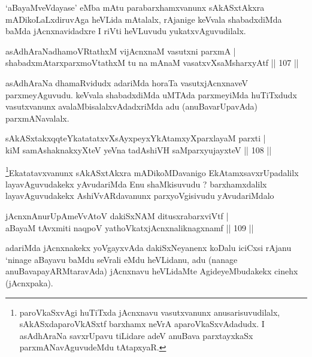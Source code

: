 \begin{artha}
`aBayaMveVdayase' eMba mAtu parabarxhamxvanunx sAkASxtAkxra mADikoLaLxdiruvAga heVLida mAtalalx, rAjanige keVvala shabadxdiMda baMda jAcnxnavidadxre I riVti heVLuvudu yukatxvAguvudilalx.
\end{artha}

\begin{shl}
asAdhAraNadhamoVRtathxM vijAcnxnaM vasutxni parxmA |\\
shabadxmAtarxparxmoVtathxM tu na mAnaM vasatxvXsaMsharxyAtf \hfill || 107 || 
\end{shl}

\begin{artha}
asAdhAraNa dhamaRvidudx adariMda horaTa vasutxjAcnxnaveV parxmeyAguvudu. keVvala shabadxdiMda uMTAda parxmeyiMda huTiTxdudx vasutxvanunx avalaMbisalalxvAdadxriMda adu (anuBavarUpavAda) parxmANavalalx.
\end{artha}

\begin{shl}
sAkASxtakxqqteYkatatatxvXsAyxpeyxYkAtamxyXparxlayaM parxti |\\
kiM samAshaknakxyXteV yeVna tadAshiVH saMparxyujayxteV \hfill || 108 || 
\end{shl}

\begin{artha}
\footnote{paroVkaSxvAgi huTiTxda jAcnxnavu vasutxvanunx anusarisuvudilalx, sAkASxdaparoVkASxtf barxhamx neVrA aparoVkaSxvAdadudx. I asAdhAraNa savxrUpavu tiLidare adeV anuBava parxtayxkaSx parxmANavAguvudeMdu tAtapxyaR.}Ekatatavxvanunx sAkASxtAkxra mADikoMDavanigo EkAtamxsavxrUpadalilx layavAguvudakekx yAvudariMda Enu shaMkisuvudu ? barxhamxdalilx layavAguvudakekx AshiVvARdavanunx parxyoVgisivudu yAvudariMdalo
\end{artha}

\begin{shl}
jAcnxnAnurUpAmeVvAtoV dakiSxNAM ditusxrabarxviVtf |\\
aBayaM tAvxmiti naqpoV yathoVkatxjAcnxnaliknagxnamf \hfill || 109 || 
\end{shl}

\begin{artha}
adariMda jAcnxnakekx yoVgayxvAda dakiSxNeyanenx koDalu iciCxsi rAjanu `ninage aBayavu baMdu seVrali eMdu heVLidanu, adu (nanage anuBavapayARMtaravAda) jAcnxnavu heVLidaMte AgideyeMbudakekx cinehx (jAcnxpaka).
\end{artha}


